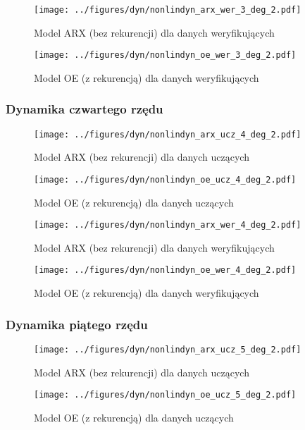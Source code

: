 \documentclass[a4paper,titlepage,11pt,floatssmall]{mwrep}
\begin{document}
\begin{figure}[H]
\centering
\texttt{[image: ../figures/dyn/nonlindyn\_arx\_wer\_3\_deg\_2.pdf]}
\caption{Model ARX (bez rekurencji) dla danych weryfikujących}
\end{figure}

\begin{figure}[H]
\centering
\texttt{[image: ../figures/dyn/nonlindyn\_oe\_wer\_3\_deg\_2.pdf]}
\caption{Model OE (z rekurencją) dla danych weryfikujących}
\end{figure}

\subsubsection{Dynamika czwartego rzędu}
\begin{figure}[H]
\centering
\texttt{[image: ../figures/dyn/nonlindyn\_arx\_ucz\_4\_deg\_2.pdf]}
\caption{Model ARX (bez rekurencji) dla danych uczących}
\end{figure}

\begin{figure}[H]
\centering
\texttt{[image: ../figures/dyn/nonlindyn\_oe\_ucz\_4\_deg\_2.pdf]}
\caption{Model OE (z rekurencją) dla danych uczących}
\end{figure}

\begin{figure}[H]
\centering
\texttt{[image: ../figures/dyn/nonlindyn\_arx\_wer\_4\_deg\_2.pdf]}
\caption{Model ARX (bez rekurencji) dla danych weryfikujących}
\end{figure}

\begin{figure}[H]
\centering
\texttt{[image: ../figures/dyn/nonlindyn\_oe\_wer\_4\_deg\_2.pdf]}
\caption{Model OE (z rekurencją) dla danych weryfikujących}
\end{figure}

\subsubsection{Dynamika piątego rzędu}
\begin{figure}[H]
\centering
\texttt{[image: ../figures/dyn/nonlindyn\_arx\_ucz\_5\_deg\_2.pdf]}
\caption{Model ARX (bez rekurencji) dla danych uczących}
\end{figure}

\begin{figure}[H]
\centering
\texttt{[image: ../figures/dyn/nonlindyn\_oe\_ucz\_5\_deg\_2.pdf]}
\caption{Model OE (z rekurencją) dla danych uczących}
\end{figure}
\end{document}
